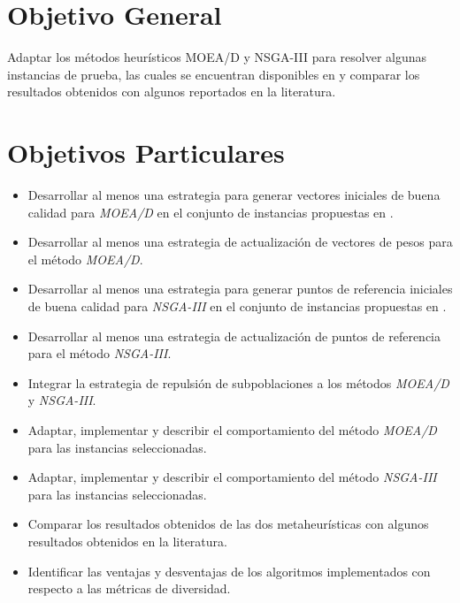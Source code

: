 \documentclass[letterpaper,10pt]{article}
\begin{document}
\section{Objetivo General}

Adaptar los métodos heurísticos MOEA/D y NSGA-III para resolver algunas instancias de prueba, las cuales se encuentran disponibles en \cite{zhang2008multiobjective} y comparar los resultados obtenidos con algunos reportados en la literatura.

\section{Objetivos Particulares}

\begin{itemize}
\item Desarrollar al menos una estrategia para generar vectores iniciales de buena calidad para \emph{MOEA/D} en el conjunto de instancias propuestas en \cite{zhang2008multiobjective}.

\item Desarrollar al menos una estrategia de actualización de vectores de pesos para el método \emph{MOEA/D}.

\item Desarrollar al menos una estrategia para generar puntos de referencia iniciales de buena calidad para \emph{NSGA-III} en el conjunto de instancias propuestas en \cite{zhang2008multiobjective}.

\item Desarrollar al menos una estrategia de actualización de puntos de referencia para el método \emph{NSGA-III}.

\item Integrar la estrategia de repulsión de subpoblaciones\cite{ahrari2016multimodal} a los métodos \emph{MOEA/D} y \emph{NSGA-III}.

\item Adaptar, implementar y describir el comportamiento del método \emph{MOEA/D} para las instancias seleccionadas.
 
\item Adaptar, implementar y describir el comportamiento del método \emph{NSGA-III} para las instancias seleccionadas.

\item Comparar los resultados obtenidos de las dos metaheurísticas con algunos resultados obtenidos en la literatura.

\item Identificar las ventajas y desventajas de los algoritmos implementados con respecto a las métricas de diversidad.
\end{itemize}
\end{document}
